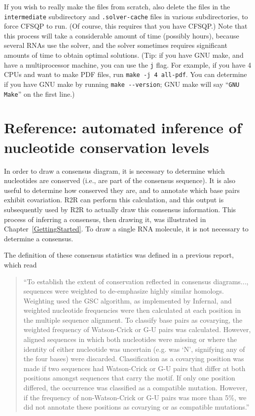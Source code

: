 \documentclass[letterpaper,12pt]{report}
\begin{document}
If you wish to really make the files from scratch, also delete the files in the {\tt intermediate} subdirectory and {\tt .solver-cache} files in various subdirectories, to force CFSQP to run.  (Of course, this requires that you have CFSQP.)
Note that this process will take a considerable amount of time (possibly hours), because several RNAs use the solver, and the solver sometimes requires significant amounts of time to obtain optimal solutions.
(Tip: if you have GNU make, and have a multiprocessor machine, you can use the {\tt j} flag.  For example, if you have 4 CPUs and want to make PDF files, run {\tt make -j 4 all-pdf}.
You can determine if you have GNU make by running {\tt make -{}-version}; GNU make will say ``{\tt GNU Make}'' on the first line.)

\chapter{Reference: automated inference of nucleotide conservation levels}
\label{consensus}

In order to draw a consensus diagram, it is necessary to determine which nucleotides are conserved
(i.e., are part of the consensus sequence).  It is also useful to determine how conserved they are, and
to annotate which base pairs exhibit covariation.
R2R can perform this calculation, and this output is subsequently used by R2R to actually draw this consensus information.
This process of inferring a consensus, then drawing it, was illustrated in Chapter~\ref{GettingStarted}.
To draw a single RNA molecule, it is not necessary to determine a consensus.

The definition of these consensus statistics was defined in a previous report\cite{Weinberg22Motifs}, which read

\begin{quote}
``To establish the extent of conservation reflected in
consensus diagrams..., sequences were
weighted to de-emphasize highly similar homologs.
Weighting used the GSC algorithm\cite{GSC}, as implemented
by Infernal\cite{InfernalUserGuide}, and weighted nucleotide frequencies were
then calculated at each position in the multiple sequence
alignment. To classify base pairs as covarying, the
weighted frequency of Watson-Crick or G-U pairs was
calculated. However, aligned sequences in which both
nucleotides were missing or where the identity of either
nucleotide was uncertain (e.g. was `N', signifying any
of the four bases) were discarded. Classification as a
covarying position was made if two sequences had
Watson-Crick or G-U pairs that differ at both positions
amongst sequences that carry the motif. If only one
position differed, the occurrence was classified as a
compatible mutation. However, if the frequency of non-Watson-Crick or G-U pairs was more than 5\%, we did
not annotate these positions as covarying or as compatible
mutations.''
\end{quote}
\end{document}
